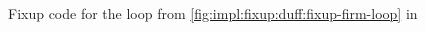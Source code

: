 \begin{figure}[h]
	\begin{adjustbox}{max width=\textwidth}
		
	\end{adjustbox}
	\caption{Fixup code for the loop from \cref{fig:impl:fixup:duff:fixup-firm-loop} in \libFIRM}\label{fig:impl:fixup:duff:fixup-firm}
\end{figure}